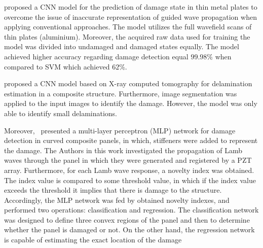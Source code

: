 
\textcite{Melville1949} proposed a CNN model for the prediction of damage state in thin metal plates to overcome the issue of inaccurate representation of guided wave propagation when applying conventional approaches. 
The model utilizes the full wavefie\-ld scans of thin plates (aluminium).
Moreover, the acquired raw data used for training the model was divided into undamaged and damaged states equally.
The model achieved higher accuracy regarding damage detection equal \(99.98\%\) when compared to SVM which achieved \(62\%\).

\textcite{Sammons2016} proposed a CNN model based on X-ray computed tomography for delamination estimation in a composite structure.
Furthermore, image segmentation was applied to the input images to identify the damage.
However, the model was only able to identify small delaminations.

Moreover,~\textcite{Chetwynd2008} presented a multi-layer perceptron (MLP) network for damage detection in curved composite panels, in which, stiffeners were added to represent the damage.
The Authors in this work investigated the propagation of Lamb waves through the panel in which they were generated and registered by a PZT array.
Furthermore, for each Lamb wave response, a novelty index was obtained.
The index value is compared to some threshold value, in which if the index value exceeds the threshold it implies that there is damage to the structure.
Accordingly, the MLP network was fed by obtained novelty indexes, and performed two operations: classification and regression.
The classification network was designed to define three convex regions of the panel and then to determine whether the panel is damaged or not.
On the other hand, the regression network is capable of estimating the exact location of the damage

